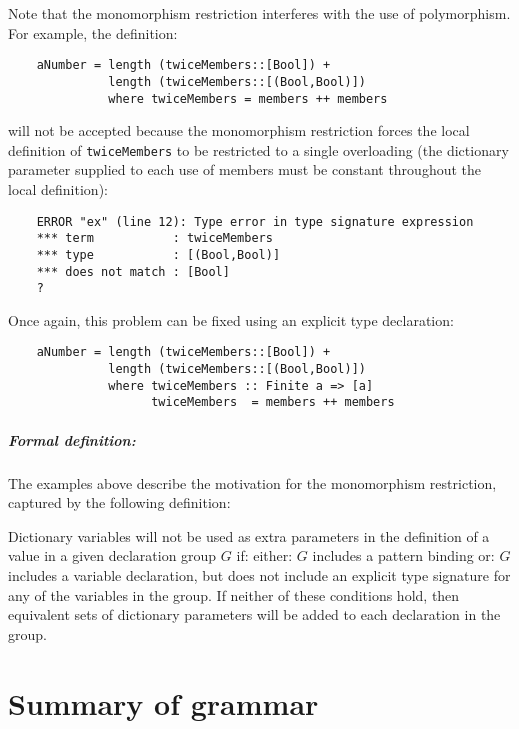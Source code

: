     Note that the monomorphism restriction interferes with the use  of
     polymorphism.  For example, the definition:
\begin{verbatim}
    aNumber = length (twiceMembers::[Bool]) +
              length (twiceMembers::[(Bool,Bool)])
              where twiceMembers = members ++ members
\end{verbatim}
     will not be accepted because the monomorphism  restriction  forces
     the local definition of  \verb"twiceMembers"  to  be  restricted  to  a
     single overloading (the dictionary parameter supplied to each  use
     of members must be constant throughout the local definition):
\begin{verbatim}
    ERROR "ex" (line 12): Type error in type signature expression
    *** term           : twiceMembers
    *** type           : [(Bool,Bool)]
    *** does not match : [Bool]
    ?
\end{verbatim}
     Once again, this problem can  be  fixed  using  an  explicit  type
     declaration:
\begin{verbatim}
    aNumber = length (twiceMembers::[Bool]) +
              length (twiceMembers::[(Bool,Bool)])  
              where twiceMembers :: Finite a => [a]
                    twiceMembers  = members ++ members
\end{verbatim}
\EI

\paragraph{Formal definition:}
The  examples  above  describe  the  motivation  for  the  monomorphism
restriction, captured by the following definition:

Dictionary variables will not  be  used  as  extra  parameters  in  the
definition of a value in a given declaration group $G$ if:
\BSI
\IT either:  $G$ includes a pattern binding
\IT or:  $G$ includes a variable declaration, but does not include  an
            explicit type signature for any of  the  variables  in  the
            group.
\ESI
If neither of these conditions hold, then equivalent sets of dictionary
parameters will be added to each declaration in the group.






\appendix

\chapter{Summary of grammar}

